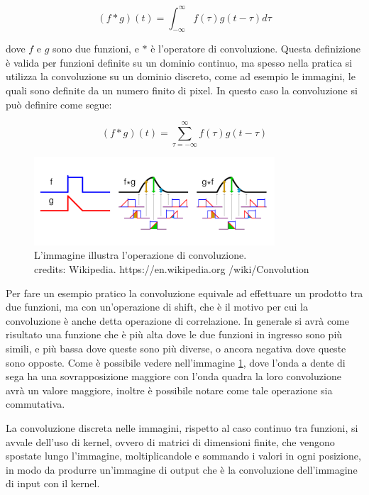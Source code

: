 \begin{equation}
    \label{eq:convolution}
    (f * g)(t) = \int_{-\infty}^{\infty} f(\tau)g(t-\tau)d\tau
\end{equation}

dove $f$ e $g$ sono due funzioni, e $*$ è l'operatore di convoluzione. Questa definizione è valida per funzioni definite su un dominio
continuo, ma spesso nella pratica si utilizza la convoluzione su un dominio discreto, come ad esempio le immagini, le quali sono 
definite da un numero finito di pixel. In questo caso la convoluzione si può definire come segue:

\begin{equation}
    \label{eq:convolution_discrete}
    (f * g)(t) = \sum_{\tau=-\infty}^{\infty} f(\tau)g(t-\tau)
\end{equation}

\begin{figure}[h]
    \centering
    \includegraphics[width=0.8\textwidth]{imgs/Comparison_convolution_correlation_1.png}
    \caption{L'immagine illustra l'operazione di convoluzione.\\
    credits: Wikipedia. https://en.wikipedia.org /wiki/Convolution}
    \label{fig:convolution_example}
\end{figure}

Per fare un esempio pratico la convoluzione equivale ad effettuare un prodotto tra due funzioni, ma con un'operazione di shift, che è il motivo per cui
la convoluzione è anche detta operazione di correlazione. In generale si avrà come risultato una funzione che è più alta dove le due funzioni
in ingresso sono più simili, e più bassa dove queste sono più diverse, o ancora negativa dove queste sono opposte.
Come è possibile vedere nell'immagine \ref{fig:convolution_example}, dove l'onda a dente di sega ha una sovrapposizione maggiore con l'onda quadra
la loro convoluzione avrà un valore maggiore, inoltre è possibile notare come tale operazione sia commutativa.

La convoluzione discreta nelle immagini, rispetto al caso continuo tra funzioni, si avvale dell'uso di kernel, ovvero di matrici di dimensioni
finite, che vengono spostate lungo l'immagine, moltiplicandole e sommando i valori in ogni posizione, in modo da produrre un'immagine di output che è
la convoluzione dell'immagine di input con il kernel.

